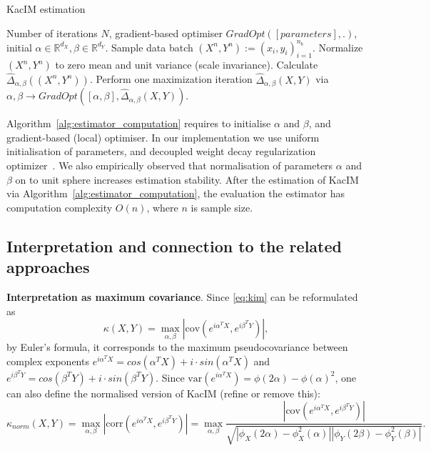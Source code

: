 \documentclass{article}
\newcommand{\cov}{\mathrm{cov}}
\newcommand{\corr}{\mathrm{corr}}
\newcommand{\var}{\mathrm{var}}
\begin{document}
\begin{algorithm}
	\caption{KacIM estimation}\label{alg:estimator_computation}
	\begin{algorithmic}
		\Require Number of iterations $N$, gradient-based optimiser $GradOpt([parameters],.)$, initial $\alpha \in \mathbb{R}^{d_{X}}, \beta \in \mathbb{R}^{d_{Y}}$.
		\State Sample data batch $(X^{n},Y^{n}):=(x_{i},y_{i})_{i=1}^{n_{b}}$.
		\State Normalize $(X^{n},Y^{n})$ to zero mean and unit variance (scale invariance).
		\State Calculate  $\widehat{\Delta}_{\alpha, \beta}((X^{n},Y^{n}))$.
		\State Perform one maximization iteration $\widehat{\Delta}_{\alpha, \beta}(X,Y)$ via $\alpha, \beta \rightarrow GradOpt([\alpha, \beta], \widehat{\Delta}_{\alpha, \beta}(X,Y))$.
		\EndFor
	\end{algorithmic}
\end{algorithm}



Algorithm~\ref{alg:estimator_computation} requires to initialise $\alpha$ and $\beta$, and gradient-based (local) optimiser. In our implementation we use uniform initialisation of parameters, and decoupled weight decay regularization optimizer~\cite{Loshchilov2019DecoupledWD}. 
We also empirically observed that normalisation of parameters $\alpha$ and $\beta$ on to unit sphere increases estimation stability. After the estimation of KacIM via Algorithm~\ref{alg:estimator_computation}, the evaluation the estimator  has computation complexity $O(n)$, where $n$ is sample size.



\subsection{Interpretation and connection to the related approaches}
\textbf{Interpretation as maximum covariance}. Since \eqref{eq:kim} can be reformulated as
\begin{equation}
\kappa(X,Y) = \max_{\alpha,\beta} |\cov(e^{i\alpha^{T}X},e^{i\beta^{T}Y})|,
\end{equation}
by Euler's formula, it corresponds to the maximum pseudocovariance between complex exponents $e^{i\alpha^{T}X} = cos(\alpha^{T}X) + i \cdot sin(\alpha^{T}X)$ and $e^{i\beta^{T}Y} = cos(\beta^{T}Y) + i \cdot sin(\beta^{T}Y)$.
Since $\var(e^{i\alpha^{T}X}) = \phi(2\alpha) - \phi(\alpha)^2$, one can also define the normalised version of KacIM (refine or remove this):
\begin{equation}
\kappa_{norm}(X,Y) = \max_{\alpha,\beta} |\corr(e^{i\alpha^{T}X},e^{i\beta^{T}Y})| = \max_{\alpha,\beta}  \frac{|\cov(e^{i\alpha^{T}X},e^{i\beta^{T}Y})|}{\sqrt{|\phi_{X}(2\alpha)-\phi_{X}^{2}(\alpha)||\phi_{Y}(2\beta)-\phi_{Y}^{2}(\beta)|}}.
\end{equation}
\end{document}
